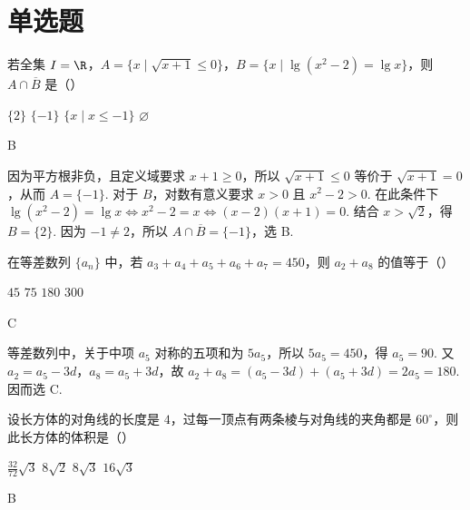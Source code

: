 \documentclass[UTF8,a4paper,oneside,11pt]{ctexbook}
\begin{document}
\section{单选题}

\begin{problem}
若全集 \(I = \R\)，\(A = \{x \mid \sqrt{x + 1} \leqslant 0\}\)，\(B = \{x \mid \lg(x^2 - 2) = \lg x\}\)，则 \(A \cap \overline{B}\) 是（\quad）

\choices
    {\(\{2\}\)}
    {\(\{-1\}\)}
    {\(\{x \mid x \leqslant -1\}\)}
    {\(\varnothing\)}
\end{problem}

\begin{answer}
B
\end{answer}

\begin{solution}
因为平方根非负，且定义域要求 \(x+1\geqslant0\)，所以 \(\sqrt{x+1}\leqslant0\) 等价于 \(\sqrt{x+1}=0\)，从而 \(A=\{-1\}\). 对于 \(B\)，对数有意义要求 \(x>0\) 且 \(x^2-2>0\). 在此条件下
\(\lg(x^2-2)=\lg x\Longleftrightarrow x^2-2=x\Longleftrightarrow(x-2)(x+1)=0\). 结合 \(x>\sqrt2\)，得 \(B=\{2\}\). 因为 \(-1\neq2\)，所以 \(A\cap\overline B=\{-1\}\)，选 B.
\end{solution}

\begin{problem}
在等差数列 \(\{a_n\}\) 中，若 \(a_3 + a_4 + a_5 + a_6 + a_7 = 450\)，则 \(a_2 + a_8\) 的值等于（\quad）

\choices
    {\(45\)}
    {\(75\)}
    {\(180\)}
    {\(300\)}
\end{problem}

\begin{answer}
C
\end{answer}

\begin{solution}
等差数列中，关于中项 \(a_5\) 对称的五项和为 \(5a_5\)，所以 \(5a_5=450\)，得 \(a_5=90\). 又 \(a_2=a_5-3d\)，\(a_8=a_5+3d\)，故
\(a_2+a_8=(a_5-3d)+(a_5+3d)=2a_5=180\). 因而选 C.
\end{solution}

\begin{problem}
设长方体的对角线的长度是 \(4\)，过每一顶点有两条棱与对角线的夹角都是 \(60^{\circ}\)，则此长方体的体积是（\quad）

\choices
    {\(\frac{32}{72}\sqrt{3}\)}
    {\(8\sqrt{2}\)}
    {\(8\sqrt{3}\)}
    {\(16\sqrt{3}\)}
\end{problem}

\begin{answer}
B
\end{answer}
\end{document}
